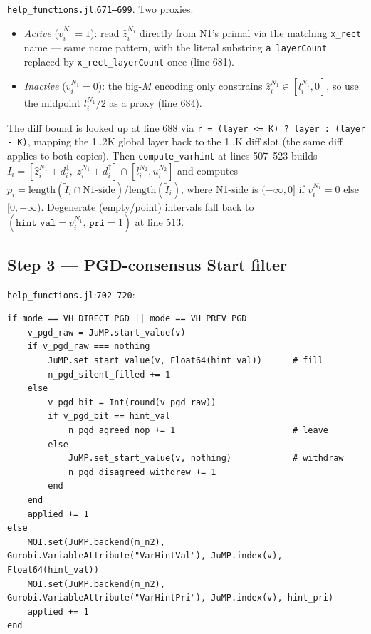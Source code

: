 \documentclass[11pt]{article}
\newcommand{\src}[1]{\texttt{\small #1}}
\newcommand{\fileline}[2]{\src{#1}:\src{#2}}
\begin{document}
\fileline{help\_functions.jl}{671--699}. Two proxies:

\begin{itemize}[noitemsep]
  \item \emph{Active} ($v^{N_1}_i = 1$): read $\hat z^{N_1}_i$
    directly from N1's primal via the matching \src{x\_rect}
    name --- same name pattern, with the literal substring
    \src{a\_layerCount} replaced by \src{x\_rect\_layerCount} once
    (line 681).
  \item \emph{Inactive} ($v^{N_1}_i = 0$): the big-$M$ encoding
    only constrains $\hat z^{N_1}_i \in [l^{N_1}_i, 0]$, so use
    the midpoint $l^{N_1}_i / 2$ as a proxy (line 684).
\end{itemize}

The diff bound is looked up at line 688 via
\src{r = (layer <= K) ? layer : (layer - K)}, mapping the
1..2K global layer back to the 1..K diff slot (the same diff
applies to both copies). Then \src{compute\_varhint} at lines
507--523 builds
\(
  \tilde I_i = [\hat z^{N_1}_i + d^\downarrow_i,\; \hat z^{N_1}_i + d^\uparrow_i] \cap [l^{N_2}_i, u^{N_2}_i]
\)
and computes
\(
  p_i = \mathrm{length}(\tilde I_i \cap \text{N1-side}) / \mathrm{length}(\tilde I_i)
\),
where N1-side is $(-\infty, 0]$ if $v^{N_1}_i = 0$ else
$[0, +\infty)$. Degenerate (empty/point) intervals fall back to
$(\mathtt{hint\_val} = v^{N_1}_i,\, \mathtt{pri} = 1)$ at line 513.

\subsection{Step 3 --- PGD-consensus Start filter}

\fileline{help\_functions.jl}{702--720}:

\begin{lstlisting}[style=jl]
if mode == VH_DIRECT_PGD || mode == VH_PREV_PGD
    v_pgd_raw = JuMP.start_value(v)
    if v_pgd_raw === nothing
        JuMP.set_start_value(v, Float64(hint_val))      # fill
        n_pgd_silent_filled += 1
    else
        v_pgd_bit = Int(round(v_pgd_raw))
        if v_pgd_bit == hint_val
            n_pgd_agreed_nop += 1                       # leave
        else
            JuMP.set_start_value(v, nothing)            # withdraw
            n_pgd_disagreed_withdrew += 1
        end
    end
    applied += 1
else
    MOI.set(JuMP.backend(m_n2), Gurobi.VariableAttribute("VarHintVal"), JuMP.index(v), Float64(hint_val))
    MOI.set(JuMP.backend(m_n2), Gurobi.VariableAttribute("VarHintPri"), JuMP.index(v), hint_pri)
    applied += 1
end
\end{lstlisting}
\end{document}
